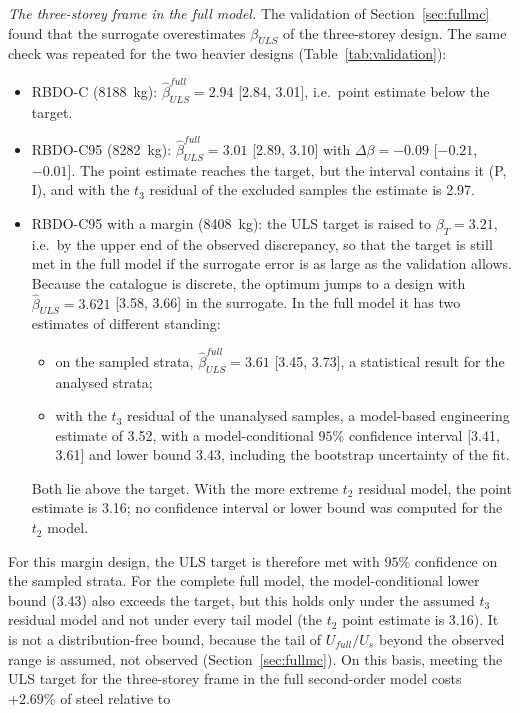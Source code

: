 \emph{The three-storey frame in the full model.} The validation of Section~\ref{sec:fullmc} found
that the surrogate overestimates $\beta_{ULS}$ of the three-storey design. The same check was
repeated for the two heavier designs (Table~\ref{tab:validation}):
\begin{itemize}
\item RBDO-C (8188~kg): $\hat\beta^{full}_{ULS}=2.94$ [2.84, 3.01], i.e.\ point estimate below the
target.
\item RBDO-C95 (8282~kg): $\hat\beta^{full}_{ULS}=3.01$ [2.89, 3.10] with $\Delta\beta=-0.09$
[$-0.21$, $-0.01$]. The point estimate reaches the target, but the interval contains it (P, I), and
with the $t_3$ residual of the excluded samples the estimate is 2.97.
\item RBDO-C95 with a margin (8408~kg): the ULS target is raised to $\beta_T=3.21$, i.e.\ by the upper
end of the observed discrepancy, so that the target is still met in the full model if the surrogate
error is as large as the validation allows. Because the catalogue is discrete, the optimum jumps to a
design with $\hat\beta_{ULS}=3.621$ [3.58, 3.66] in the surrogate. In the full model it has two
estimates of different standing:
\begin{itemize}
\item on the sampled strata, $\hat\beta^{full}_{ULS}=3.61$ [3.45, 3.73], a statistical result for the
analysed strata;
\item with the $t_3$ residual of the unanalysed samples, a model-based engineering estimate of 3.52,
with a model-conditional $95\%$ confidence interval [3.41, 3.61] and lower bound 3.43, including the
bootstrap uncertainty of the fit.
\end{itemize}
Both lie above the target. With the more extreme $t_2$ residual model, the point estimate is 3.16;
no confidence interval or lower bound was computed for the $t_2$ model.
\end{itemize}
For this margin design, the ULS target is therefore met with $95\%$ confidence on the sampled
strata. For the complete full model, the model-conditional lower bound (3.43) also exceeds the target, but
this holds only under the assumed $t_3$ residual model and not under every tail model (the $t_2$
point estimate is 3.16). It is not a distribution-free bound, because the tail of $U_{full}/U_s$ beyond the
observed range is assumed, not observed (Section~\ref{sec:fullmc}). On this basis, meeting the ULS
target for the three-storey frame in the full second-order model costs $+2.69\%$ of steel relative to
